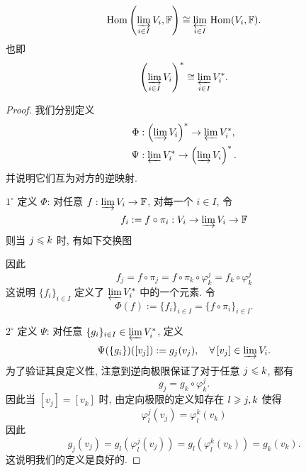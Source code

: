 \begin{theorem}[定向极限的对偶是对偶的逆向极限]
    \begin{equation*}
        \mathrm{Hom}\left(\varinjlim_{i\in I}V_i,\mathbb{F}\right)
        \cong\varprojlim_{i\in I}\,\mathrm{Hom}(V_i,\mathbb{F}).
    \end{equation*}
    也即
    \begin{equation*}
        \left(\varinjlim_{i\in I}V_i\right)^*
        \cong\varprojlim_{i\in I}V_i^*.
    \end{equation*}
\end{theorem}
\begin{proof}
    我们分别定义 
    \begin{align*}
        \Phi&:\left(\varinjlim V_i\right)^*
        \rightarrow\varprojlim V_i^*, \\
        \Psi&:\varprojlim V_i^*\rightarrow
        \left(\varinjlim V_i\right)^*.
    \end{align*}
    并说明它们互为对方的逆映射.

    $1^{\circ}$ 定义 $\Phi$: 对任意 
    $f:\varinjlim V_i\rightarrow\mathbb{F}$, 对每一个 $i\in I$, 
    令 
    \begin{equation*}
        f_i:=f\circ \pi_i:V_i\rightarrow\varinjlim V_i\rightarrow\mathbb{F}
    \end{equation*}
    则当 $j\leqslant k$ 时, 有如下交换图
    \begin{center}
    \end{center}
    因此
    \begin{equation*}
        f_j=f\circ\pi_j
        =f\circ\pi_k\circ\varphi^j_k=f_k\circ\varphi^j_k
    \end{equation*}
    这说明 $\{f_i\}_{i\in I}$ 定义了 $\varprojlim V^*_i$ 
    中的一个元素. 
    令 
    \begin{equation*}
        \Phi(f):=\{f_i\}_{i\in I}=\{f\circ\pi_i\}_{i\in I}.
    \end{equation*}

    $2^{\circ}$ 定义 $\Psi$: 对任意 
    $\{g_i\}_{i\in I}\in\varprojlim V^*_i$, 定义 
    \begin{equation*}
        \Psi(\{g_i\})([v_j]):=g_j(v_j),\quad
        \forall\,[v_j]\in\varinjlim V_i.
    \end{equation*}
    为了验证其良定义性, 注意到逆向极限保证了对于任意 $j\leqslant k$, 
    都有 
    \begin{equation*}
        g_j = g_k \circ \varphi^j_k.
    \end{equation*}
    因此当 $[v_j]=[v_k]$ 时, 
    由定向极限的定义知存在 $l\geqslant j,k$ 使得 
    \begin{equation*}
        \varphi^j_l(v_j)=\varphi^k_l(v_k)
    \end{equation*} 
    因此 
    \begin{equation*}
        g_j(v_j) = g_l(\varphi^j_l(v_j))
        =g_l(\varphi^k_l(v_k))=g_k(v_k).
    \end{equation*}
    这说明我们的定义是良好的. 


\end{proof}
